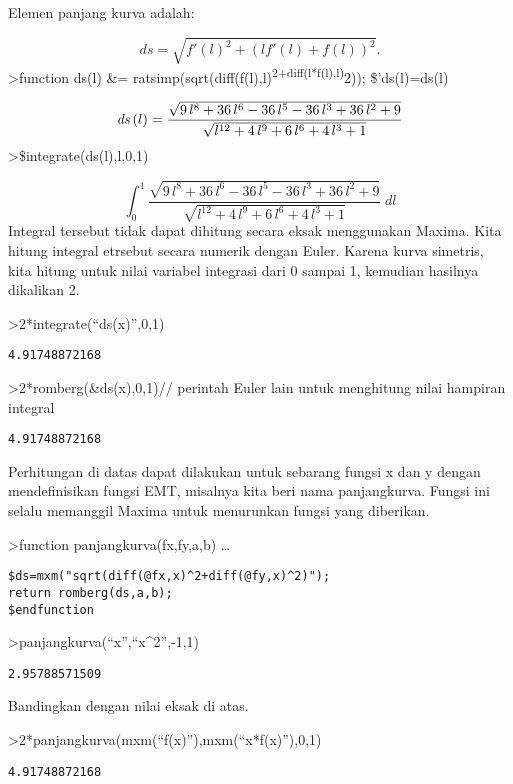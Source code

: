 \documentclass[
]{book}
\begin{document}
Elemen panjang kurva adalah:

\[ds=\sqrt{f'(l)^2+(lf'(l)+f(l))^2}.\]\textgreater function ds(l) \&= ratsimp(sqrt(diff(f(l),l)\textsuperscript{2+diff(l*f(l),l)}2)); \$'ds(l)=ds(l)

\[{\it ds}\left(l\right)=\frac{\sqrt{9\,l^8+36\,l^6-36\,l^5-36\,l^3+  36\,l^2+9}}{\sqrt{l^{12}+4\,l^9+6\,l^6+4\,l^3+1}}\]\textgreater\$integrate(ds(l),l,0,1)

\[\int_{0}^{1}{\frac{\sqrt{9\,l^8+36\,l^6-36\,l^5-36\,l^3+36\,l^2+9}  }{\sqrt{l^{12}+4\,l^9+6\,l^6+4\,l^3+1}}\;dl}\]Integral tersebut tidak dapat dihitung secara eksak menggunakan Maxima. Kita hitung integral etrsebut secara numerik dengan Euler. Karena kurva simetris, kita hitung untuk nilai variabel integrasi dari 0 sampai 1, kemudian hasilnya dikalikan 2.

\textgreater2*integrate(``ds(x)'',0,1)

\begin{verbatim}
4.91748872168
\end{verbatim}

\textgreater2*romberg(\&ds(x),0,1)// perintah Euler lain untuk menghitung nilai hampiran integral

\begin{verbatim}
4.91748872168
\end{verbatim}

Perhitungan di datas dapat dilakukan untuk sebarang fungsi x dan y dengan mendefinisikan fungsi EMT, misalnya kita beri nama panjangkurva. Fungsi ini selalu memanggil Maxima untuk menurunkan fungsi yang diberikan.

\textgreater function panjangkurva(fx,fy,a,b) \ldots{}

\begin{verbatim}
$ds=mxm("sqrt(diff(@fx,x)^2+diff(@fy,x)^2)");
return romberg(ds,a,b);
$endfunction
\end{verbatim}

\textgreater panjangkurva(``x'',``x\^{}2'',-1,1)

\begin{verbatim}
2.95788571509
\end{verbatim}

Bandingkan dengan nilai eksak di atas.

\textgreater2*panjangkurva(mxm(``f(x)''),mxm(``x*f(x)''),0,1)

\begin{verbatim}
4.91748872168
\end{verbatim}
\end{document}
